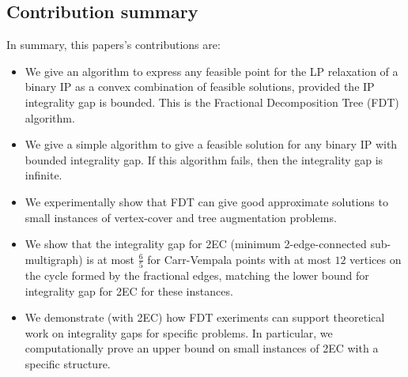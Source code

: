 \subsection{Contribution summary}
In summary, this papers's contributions are:
\begin{itemize}
\item We give an algorithm to express any feasible point for the LP relaxation of a binary IP
as a convex combination of feasible solutions, provided the IP integrality gap is bounded.  This is the Fractional Decomposition Tree (FDT) algorithm.
\item We give a simple  algorithm to give a feasible solution for any binary IP with bounded integrality gap. If this algorithm fails, then the integrality gap is infinite.
\item We experimentally show that FDT can give good approximate solutions to small instances of vertex-cover and tree augmentation problems.
\item We show that the integrality gap for 2EC (minimum 2-edge-connected sub-multigraph) is at most $\frac{6}{5}$ for Carr-Vempala points with at most $12$ vertices on the cycle formed by the fractional edges, matching the lower bound for integrality gap for 2EC for these instances.
\item We demonstrate (with 2EC) how FDT exeriments can support theoretical work on integrality gaps for specific problems. In particular, we computationally prove an upper bound on small instances of 2EC with a specific structure.
\end{itemize}


